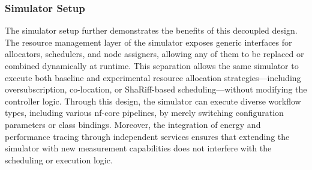 \subsubsection{Simulator Setup}
\label{sec:simulator_setup}
The simulator setup further demonstrates the benefits of this decoupled design. The resource management layer of the simulator exposes generic interfaces for allocators, schedulers, and node assigners, allowing any of them to be replaced or combined dynamically at runtime. This separation allows the same simulator to execute both baseline and experimental resource allocation strategies—including oversubscription, co-location, or ShaRiff-based scheduling—without modifying the controller logic. Through this design, the simulator can execute diverse workflow types, including various nf-core pipelines, by merely switching configuration parameters or class bindings. Moreover, the integration of energy and performance tracing through independent services ensures that extending the simulator with new measurement capabilities does not interfere with the scheduling or execution logic.